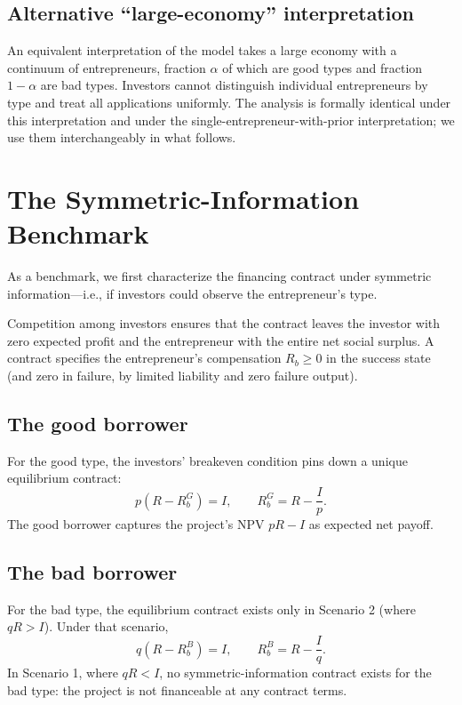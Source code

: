 \documentclass[11pt,a4paper,oneside]{book}
\def\geq{\geqslant}
\theoremstyle{plain}
\theoremstyle{definition}
\theoremstyle{remark}
\numberwithin{equation}{chapter}
\begin{document}
\subsection{Alternative ``large-economy'' interpretation}

An equivalent interpretation of the model takes a large economy with a continuum of entrepreneurs, fraction $\alpha$ of which are good types and fraction $1 - \alpha$ are bad types.
Investors cannot distinguish individual entrepreneurs by type and treat all applications uniformly.
The analysis is formally identical under this interpretation and under the single-entrepreneur-with-prior interpretation; we use them interchangeably in what follows.

\section{The Symmetric-Information Benchmark}
\label{sec:lemons-symmetric}

As a benchmark, we first characterize the financing contract under symmetric information---i.e., if investors could observe the entrepreneur's type.

Competition among investors ensures that the contract leaves the investor with zero expected profit and the entrepreneur with the entire net social surplus.
A contract specifies the entrepreneur's compensation $R_b \geq 0$ in the success state (and zero in failure, by limited liability and zero failure output).

\subsection{The good borrower}

For the good type, the investors' breakeven condition pins down a unique equilibrium contract:
\begin{equation}\label{eq:lemons-Rb-G}
  p(R - R_b^{G}) = I,
  \qquad
  R_b^{G} = R - \frac{I}{p}.
\end{equation}
The good borrower captures the project's NPV $pR - I$ as expected net payoff.

\subsection{The bad borrower}

For the bad type, the equilibrium contract exists only in Scenario 2 (where $qR > I$).
Under that scenario,
\begin{equation}\label{eq:lemons-Rb-B}
  q(R - R_b^{B}) = I,
  \qquad
  R_b^{B} = R - \frac{I}{q}.
\end{equation}
In Scenario 1, where $qR < I$, no symmetric-information contract exists for the bad type: the project is not financeable at any contract terms.
\end{document}
